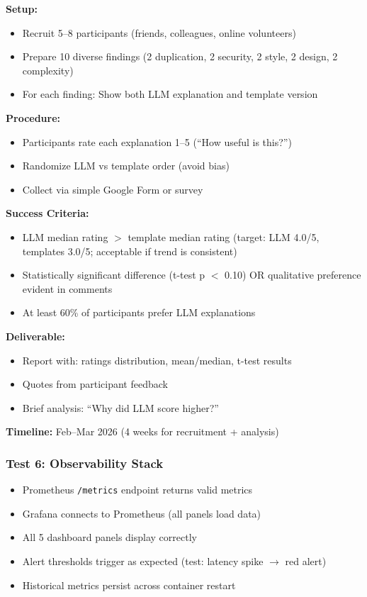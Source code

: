 \documentclass[11pt,a4paper]{article}
\begin{document}
\textbf{Setup:}
\begin{itemize}[leftmargin=*]
    \item Recruit 5–8 participants (friends, colleagues, online volunteers)
    \item Prepare 10 diverse findings (2 duplication, 2 security, 2 style, 2 design, 2 complexity)
    \item For each finding: Show both LLM explanation and template version
\end{itemize}

\textbf{Procedure:}
\begin{itemize}[leftmargin=*]
    \item Participants rate each explanation 1–5 (``How useful is this?'')
    \item Randomize LLM vs template order (avoid bias)
    \item Collect via simple Google Form or survey
\end{itemize}

\textbf{Success Criteria:}
\begin{itemize}[leftmargin=*]
    \item[$\checkmark$] LLM median rating $>$ template median rating (target: LLM 4.0/5, templates 3.0/5; acceptable if trend is consistent)
    \item[$\checkmark$] Statistically significant difference (t-test p $<$ 0.10) OR qualitative preference evident in comments
    \item[$\checkmark$] At least 60\% of participants prefer LLM explanations
\end{itemize}

\textbf{Deliverable:}
\begin{itemize}[leftmargin=*]
    \item Report with: ratings distribution, mean/median, t-test results
    \item Quotes from participant feedback
    \item Brief analysis: ``Why did LLM score higher?''
\end{itemize}

\textbf{Timeline:} Feb–Mar 2026 (4 weeks for recruitment + analysis)

\subsubsection{Test 6: Observability Stack}
\begin{itemize}[leftmargin=*]
    \item Prometheus \texttt{/metrics} endpoint returns valid metrics
    \item Grafana connects to Prometheus (all panels load data)
    \item All 5 dashboard panels display correctly
    \item Alert thresholds trigger as expected (test: latency spike $\rightarrow$ red alert)
    \item Historical metrics persist across container restart
\end{itemize}
\end{document}
